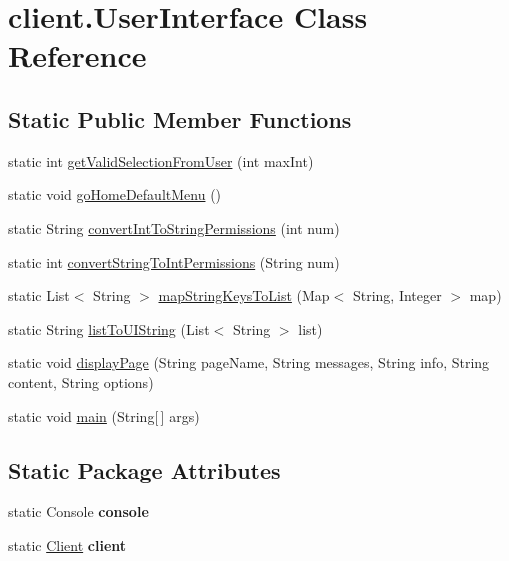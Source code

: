 \hypertarget{classclient_1_1_user_interface}{
\section{client.\-User\-Interface \-Class \-Reference}
\label{classclient_1_1_user_interface}
}
\subsection*{\-Static \-Public \-Member \-Functions}
\begin{DoxyCompactItemize}
\item 
static int \hyperlink{classclient_1_1_user_interface_ac804fd61e4b19625579ba57cde2c47e6}{get\-Valid\-Selection\-From\-User} (int max\-Int)
\item 
static void \hyperlink{classclient_1_1_user_interface_aab1e7cda933cb84dbf080a3e4a521106}{go\-Home\-Default\-Menu} ()
\item 
static \-String \hyperlink{classclient_1_1_user_interface_a6bd932f4582ec9d63a7180b4f67ee265}{convert\-Int\-To\-String\-Permissions} (int num)
\item 
static int \hyperlink{classclient_1_1_user_interface_a3b1a02f13364c0fe499ea5ecedceeea0}{convert\-String\-To\-Int\-Permissions} (\-String num)
\item 
static \-List$<$ \-String $>$ \hyperlink{classclient_1_1_user_interface_a9de4379d85bc9c1a36c600c6f0352dbc}{map\-String\-Keys\-To\-List} (\-Map$<$ \-String, \-Integer $>$ map)
\item 
static \-String \hyperlink{classclient_1_1_user_interface_aed10e98a1e7cde4d6bb25ec4bdb6ddd6}{list\-To\-U\-I\-String} (\-List$<$ \-String $>$ list)
\item 
static void \hyperlink{classclient_1_1_user_interface_a39fdee50d7a1f6e7344df3630ea596af}{display\-Page} (\-String page\-Name, \-String messages, \-String info, \-String content, \-String options)
\item 
static void \hyperlink{classclient_1_1_user_interface_ab33d39b0dc4c44431558cb7a66c6c1bb}{main} (\-String\mbox{[}$\,$\mbox{]} args)
\end{DoxyCompactItemize}
\subsection*{\-Static \-Package \-Attributes}
\begin{DoxyCompactItemize}
\item 
\hypertarget{classclient_1_1_user_interface_aa7de5c79ff80f705b85e832bc6b5f589}{
static \-Console {\bfseries console}}
\label{classclient_1_1_user_interface_aa7de5c79ff80f705b85e832bc6b5f589}

\item 
\hypertarget{classclient_1_1_user_interface_a05a86bc17502a93b7ca3ab4580681845}{
static \hyperlink{classclient_1_1_client}{\-Client} {\bfseries client}}
\label{classclient_1_1_user_interface_a05a86bc17502a93b7ca3ab4580681845}

\end{DoxyCompactItemize}


